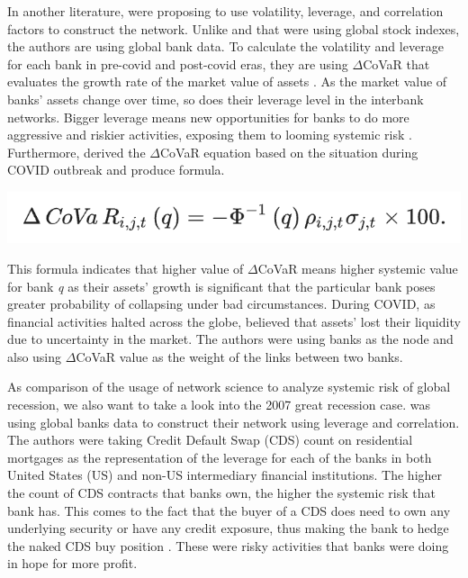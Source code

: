 \documentclass[a4paper,11pt]{article}
\begin{document}
In another literature, \cite{Duan_El_Ghoul_Guedhami_Li_Li_2020} were proposing to use volatility, leverage, and correlation factors to construct the network. Unlike \cite{Lai_Hu_2021} and \cite{Zhang_Yin_Sha_2023} that were using global stock indexes, the authors are using global bank data. To calculate the volatility and leverage for each bank in pre-covid and post-covid eras, they are using $\Delta$CoVaR that evaluates the growth rate of the market value of assets \citep{Adrian_Brunnermeier_2016}. As the market value of banks’ assets change over time, so does their leverage level in the interbank networks. Bigger leverage means new opportunities for banks to do more aggressive and riskier activities, exposing them to looming systemic risk \cite{Adrian_Brunnermeier_2009}. Furthermore, \cite{Duan_El_Ghoul_Guedhami_Li_Li_2020} derived the $\Delta$CoVaR equation based on the situation during COVID outbreak and produce formula.

\includegraphics[scale=0.7]{covar.png}

This formula indicates that higher value of $\Delta$CoVaR means higher systemic value for bank \textit{q} as their assets’ growth is significant that the particular bank poses greater probability of collapsing under bad circumstances. During COVID, as financial activities halted across the globe, \cite{Duan_El_Ghoul_Guedhami_Li_Li_2020} believed that assets’ lost their liquidity due to uncertainty in the market. The authors were using banks as the node and also using $\Delta$CoVaR value as the weight of the links between two banks.

As comparison of the usage of network science to analyze systemic risk of global recession, we also want to take a look into the 2007 great recession case. \cite{Markose_Giansante_Shaghaghi_2012} was using global banks data to construct their network using leverage and correlation. The authors were taking Credit Default Swap (CDS) count on residential mortgages as the representation of the leverage for each of the banks in both United States (US) and non-US intermediary financial institutions. The higher the count of CDS contracts that banks own, the higher the systemic risk that bank has. This comes to the fact that the buyer of a CDS does need to own any underlying security or have any credit exposure, thus making the bank to hedge the naked CDS buy position \citep{Markose_Giansante_Shaghaghi_2012}. These were risky activities that banks were doing in hope for more profit.
\end{document}
